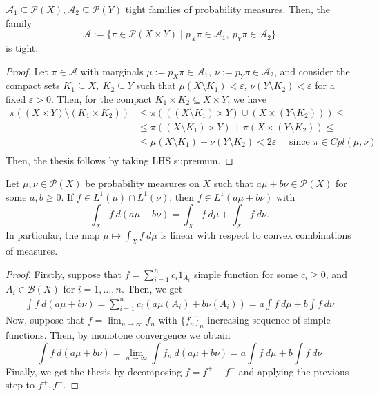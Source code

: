 \documentclass[../main.tex]{subfiles}
\begin{document}
\begin{lemma}
\label{lemma:tight_cartesian_product}
    $\mathcal{A}_1\subseteq\mathcal{P}(X), \mathcal{A}_2\subseteq\mathcal{P}(Y)$ tight families of probability measures. Then, the family $$\mathcal{A}:= \{\pi\in\mathcal{P}(X\times Y) \mid p_X\pi\in\mathcal{A}_1, \ p_Y\pi\in\mathcal{A}_2\}$$ is tight.
\end{lemma}
\begin{proof}
    Let $\pi\in\mathcal{A}$ with marginals $\mu:=p_X\pi\in\mathcal{A}_1, \ \nu:=p_Y\pi\in\mathcal{A}_2$, and consider the compact sets $K_1\subseteq X, \ K_2\subseteq Y$ such that $\mu(X\setminus K_1)<\varepsilon$, $\nu(Y \setminus K_2)<\varepsilon$ for a fixed $\varepsilon>0$. Then, for the compact $K_1 \times K_2\subseteq X \times Y$, we have
    \begin{align*}
        \pi((X\times Y) \setminus (K_1 \times K_2))
        &\leq \pi(((X\setminus K_1)\times Y) \cup (X\times (Y\setminus K_2)))\leq \\
        &\leq \pi((X\setminus K_1)\times Y) + \pi(X\times (Y\setminus K_2)) \leq \\
        &\leq \mu(X\setminus K_1) + \nu(Y\setminus K_2)< 2\varepsilon \quad \text{ since } \pi\in Cpl(\mu, \nu) \\
    \end{align*}
    Then, the thesis follows by taking LHS supremum.
\end{proof}

\begin{lemma}
\label{lemma:integral_linear}
    Let $\mu, \nu\in\mathcal{P}(X)$ be probability measures on $X$ such that $a\mu + b\nu\in\mathcal{P}(X)$ for some $a,b\geq 0$. If $f\in L^1(\mu)\cap L^1(\nu)$, then $f\in L^1(a\mu+b\nu)$ with
    $$
    \int_X f \ d(a\mu+b\nu) = \int_X f \ d\mu + \int_X f \ d\nu. 
    $$
    In particular, the map $\mu \mapsto \int_X f \ d \mu$ is linear with respect to convex combinations of measures.
\end{lemma}
\begin{proof}
    Firstly, suppose that $f = \sum_{i=1}^n c_i 1_{A_i}$ simple function for some $c_i\geq 0$, and $A_i\in\mathcal{B}(X)$ for $i=1, \dots, n$. Then, we get 
    \begin{align*}
        \int f \ d(a\mu + b\nu) 
        = \sum_{i=1}^n c_i (a \mu(A_i) + b\nu(A_i)) 
        = a \int f \ d\mu + b \int f \ d\nu
    \end{align*}
    Now, suppose that $f = \lim_{n\to \infty} f_n$ with $\{f_n\}_n$ increasing sequence of simple functions. Then, by monotone convergence we obtain
    $$
    \int f \ d(a\mu + b\nu) 
    = \lim_{n\to\infty} \int f_n \ d(a\mu+b\nu)
    = a\int f \ d\mu + b\int f \ d\nu
    $$
    Finally, we get the thesis by decomposing $f=f^+ - f^-$ and applying the previous step to $f^+, f^-$.
\end{proof}
\end{document}
